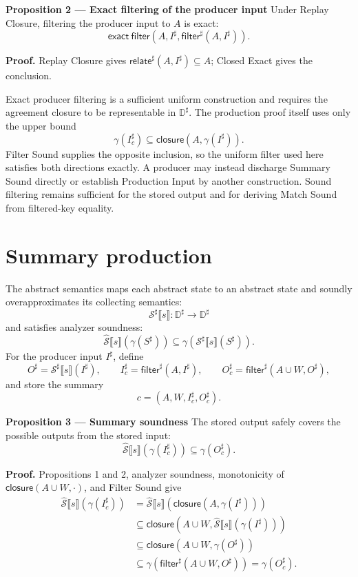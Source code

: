 \documentclass[10pt]{article}
\newcommand{\boxheading}[1]{\textbf{#1}\quad}
\newcommand{\CollectingSemantics}[1]{\widehat{\mathcal S}\mathopen{⟦}#1\mathclose{⟧}}
\newcommand{\AbstractSemantics}[1]{\mathcal S^\sharp\mathopen{⟦}#1\mathclose{⟧}}
\newcommand{\ProjClose}{\mathsf{closure}}
\newcommand{\filter}{\mathsf{filter}}
\newcommand{\relate}{\mathsf{relate}}
\newcommand{\ExactFilter}{\mathsf{exact\ filter}}
\newcommand{\qedbox}{\hfill\raisebox{0.15ex}{\fboxsep=0pt\fbox{\rule{0pt}{0.55em}\rule{0.55em}{0pt}}}}
\begin{document}
\begin{statementbox}
\boxheading{Proposition 2 --- Exact filtering of the producer input}
Under Replay Closure, filtering the producer input to \(A\) is exact:
\[
  \ExactFilter\!\left(A,I^\sharp,\filter^\sharp(A,I^\sharp)\right).
\]
\end{statementbox}

\textbf{Proof.}
Replay Closure gives \(\relate^\sharp(A,I^\sharp)\subseteq A\); Closed Exact gives the
conclusion. \qedbox

Exact producer filtering is a sufficient uniform construction and requires the agreement closure
to be representable in \(\mathbb D^\sharp\). The production proof itself uses only the upper
bound
\[
  \gamma(I_c^\sharp)
  \subseteq
  \ProjClose\!\left(A,\gamma(I^\sharp)\right).
  \tag{Production Input}
\]
Filter Sound supplies the opposite inclusion, so the uniform filter used here satisfies both
directions exactly. A producer may instead discharge Summary Sound directly or establish
Production Input by another construction. Sound filtering remains sufficient for the stored
output and for deriving Match Sound from filtered-key equality.

\section{Summary production}

The abstract semantics maps each abstract state to an abstract state and soundly overapproximates
its collecting semantics:
\[
  \AbstractSemantics{s}:\mathbb D^\sharp\to\mathbb D^\sharp
\]
and satisfies analyzer soundness:
\[
  \CollectingSemantics{s}\!\left(\gamma(S^\sharp)\right)
  \subseteq\gamma\!\left(\AbstractSemantics{s}(S^\sharp)\right).
  \tag{Analyze Sound}
\]
For the producer input \(I^\sharp\), define
\[
  O^\sharp=\AbstractSemantics{s}(I^\sharp),
  \qquad
  I_c^\sharp=\filter^\sharp(A,I^\sharp),
  \qquad
  O_c^\sharp=\filter^\sharp(A\cup W,O^\sharp),
\]
and store the summary
\[
  c=(A,W,I_c^\sharp,O_c^\sharp).
\]

\begin{statementbox}
\boxheading{Proposition 3 --- Summary soundness}
The stored output safely covers the possible outputs from the stored input:
\[
  \CollectingSemantics{s}\!\left(\gamma(I_c^\sharp)\right)
  \subseteq\gamma(O_c^\sharp).
  \tag{Summary Sound}
\]
\end{statementbox}

\textbf{Proof.}
Propositions 1 and 2, analyzer soundness, monotonicity of \(\ProjClose(A\cup W,\cdot)\), and
Filter Sound give
\begin{align*}
  \CollectingSemantics{s}\!\left(\gamma(I_c^\sharp)\right)
  &=\CollectingSemantics{s}\!\left(\ProjClose(A,\gamma(I^\sharp))\right)\\
  &\subseteq\ProjClose\!\left(A\cup W,
      \CollectingSemantics{s}(\gamma(I^\sharp))\right)\\
  &\subseteq\ProjClose\!\left(A\cup W,\gamma(O^\sharp)\right)\\
  &\subseteq\gamma\!\left(\filter^\sharp(A\cup W,O^\sharp)\right)
   =\gamma(O_c^\sharp).
\end{align*}
\qedbox
\end{document}
